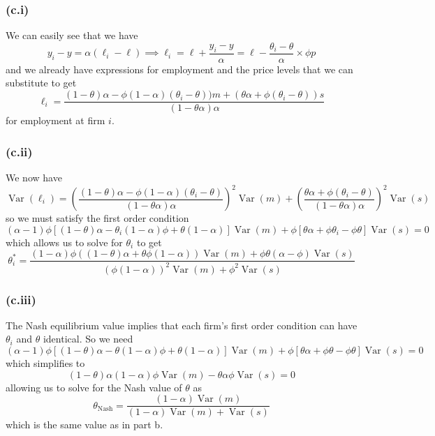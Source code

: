 \documentclass[11pt]{amsart}
\begin{document}
\subsubsection*{(c.i)}

We can easily see that we have
\[
y_i - y = \alpha (\ell_i - \ell) \implies \ell_i = \ell + \frac{y_i - y}{\alpha} = \ell - \frac{\theta_i - \theta}{\alpha} \times \phi p
\]
and we already have expressions for employment and the price levels that we can substitute to get
\[
\ell_i = \frac{(1-\theta) \alpha - \phi (1-\alpha) (\theta_i - \theta)) m + (\theta \alpha + \phi (\theta_i - \theta)) s}{(1-\theta \alpha) \alpha}
\]
for employment at firm $i$.

\subsubsection*{(c.ii)}

We now have
\[
\operatorname{Var}(\ell_i) = \left(\frac{(1-\theta) \alpha - \phi (1-\alpha) (\theta_i - \theta)}{(1-\theta \alpha) \alpha}\right)^2 \operatorname{Var}(m) + \left(\frac{\theta \alpha + \phi (\theta_i - \theta)}{(1-\theta \alpha) \alpha}\right)^2 \operatorname{Var}(s)
\]
so we must satisfy the first order condition
\[
(\alpha - 1) \phi [(1-\theta) \alpha - \theta_i (1-\alpha) \phi + \theta (1-\alpha)] \operatorname{Var}(m) + \phi[\theta \alpha + \phi \theta_i - \phi \theta] \operatorname{Var}(s) = 0
\]
which allows us to solve for $\theta_i$ to get
\[
\theta_i^* = \frac{(1-\alpha) \phi ((1-\theta)\alpha + \theta \phi (1-\alpha)) \operatorname{Var}(m) + \phi \theta(\alpha - \phi) \operatorname{Var}(s)}{(\phi(1-\alpha))^2 \operatorname{Var}(m) + \phi^2 \operatorname{Var}(s)}
\]

\subsubsection*{(c.iii)}

The Nash equilibrium value implies that each firm's first order condition can have $\theta_i$ and $\theta$ identical. So we need 
\[
(\alpha - 1) \phi [(1-\theta) \alpha - \theta (1-\alpha) \phi + \theta (1-\alpha)] \operatorname{Var}(m) + \phi[\theta \alpha + \phi \theta - \phi \theta] \operatorname{Var}(s) = 0
\]
which simplifies to 
\[
(1-\theta) \alpha (1 - \alpha) \phi \operatorname{Var}(m) - \theta \alpha \phi \operatorname{Var}(s) = 0
\]
allowing us to solve for the Nash value of $\theta$ as
\[
\theta_{\text{Nash}} = \frac{(1-\alpha) \operatorname{Var}(m)}{(1-\alpha) \operatorname{Var}(m) + \operatorname{Var}(s)}
\]
which is the same value as in part b.
\end{document}
